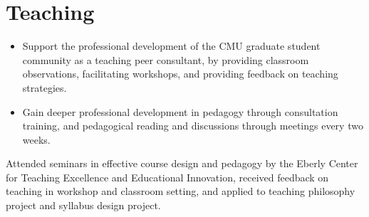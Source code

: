 \documentclass[11pt,a4paper,sans]{moderncv} %
\begin{document}





\section{Teaching}
 {}{}{}
 {}{}{}
 {}{}{}

 {}{}{
\begin{itemize}
\item Support the professional development of the CMU graduate student community as a teaching peer consultant, by providing classroom observations, facilitating workshops, and providing feedback on teaching strategies. 
\item Gain deeper professional development in pedagogy through consultation training, and pedagogical reading and discussions through meetings every two weeks.
\end{itemize}}
 {}{}{
Attended seminars in effective course design and pedagogy by the Eberly Center for Teaching Excellence and Educational Innovation, received feedback on teaching in workshop and classroom setting, and applied to teaching philosophy project and syllabus design project.
}
\end{document}
